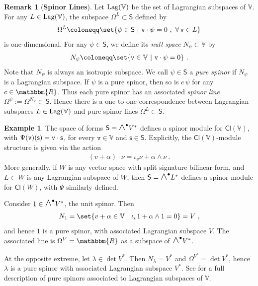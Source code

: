 \documentclass[a4paper, reqno, 11pt]{amsart}
\numberwithin{equation}{section}
\theoremstyle{definition}
\newtheorem{example}[equation]{Example}
\newtheorem{remark}[equation]{Remark}
\newcommand{\IR}{\mathbbm{R}}
\newcommand{\IV}{\mathbb{V}}
\newcommand{\Cl}{\mathsf{Cl}}
\newcommand{\sfS}{{\mathsf{S}}}
\newcommand{\sfs}{{\mathsf{s}}}
\newcommand{\midwedge}{\text {\Large$\wedge$}}
\theoremstyle{remark}
\begin{document}
\begin{remark}[\textbf{Spinor Lines}] \label{rmk:spinorlines}
Let ${\rm Lag}(\IV)$ be the set of Lagrangian subspaces of $\IV$. For any $L \in {\rm Lag}(\IV)$, the subspace $\Omega^L \subset \sfS$ defined by
\begin{align}
    \Omega^L \coloneqq \set{\psi \in \sfS \ | \ \texttt{v}\cdot \psi = 0 \ , \ \forall\, \texttt{v} \in L } 
\end{align}
is one-dimensional. For any $\psi \in \sfS$, we define its \emph{null space} $N_\psi \subset \IV$ by
\begin{align}
    N_\psi \coloneqq \set{\texttt{v} \in \IV \ | \ \texttt{v} \cdot \psi=0} \ .
\end{align}
Note that $N_\psi$ is always an isotropic subspace. We  call $\psi \in \sfS$ a \emph{pure spinor} if $N_\psi$ is a Lagrangian subspace. If $\psi$ is a pure spinor, then so is $c\, \psi$ for any $c \in \IR$. Thus each pure spinor has an associated \emph{spinor line} $\Omega^\psi:=\Omega^{N_\psi} \subset \sfS$. Hence there is a one-to-one correspondence between Lagrangian subspaces $L \in {\rm Lag}(\IV)$ and pure spinor lines $\Omega^L \subset \sfS$.
\end{remark}

\begin{example}
    The space of forms $\sfS = \midwedge^\bullet V^*$ defines a spinor module for $\Cl(\IV)$, with $\Psi ( \texttt{v})(\sfs) = \texttt{v} \cdot \sf s$, for every $\texttt{v}\in \IV$ and $\sfs \in \sfS$. Explicitly, the $\Cl(\IV)$-module structure is given via the action
\begin{align}
    (v+\alpha) \cdot \nu = \iota_v \nu + \alpha \wedge \nu \ .
\end{align}
More generally, if $W$ is any vector space with split signature bilinear form, and $L \subset W$ is any Lagrangian subspace of $W$, then $\sfS = \midwedge^\bullet L^*$ defines a spinor module for $\Cl(W)$, with $\Psi$ similarly defined.

    Consider $1 \in \midwedge^\bullet V^*$, the unit spinor. Then
    \begin{align}
        N_1 = \set{v+ \alpha\in\IV \ \vert \ \iota_v 1 + \alpha \wedge 1 = 0} = V \ ,
    \end{align}
    and hence $1$ is a pure spinor, with associated Lagrangian subspace $V$. The associated line is $\Omega^V = \IR$ as a subspace of $\midwedge^\bullet V^*$. 
    
    At the opposite extreme, let $\lambda \in \det V^*$. Then $N_\lambda = V^*$ and $\Omega^{V^*} = \det V^*$, hence $\lambda$ is a pure spinor with associated Lagrangian subspace $V^*$.
    See \cite[Section 2.5]{gualtieri:tesi} for a full description of pure spinors associated to Lagrangian subspaces of $\IV$.
\end{example}
\end{document}

